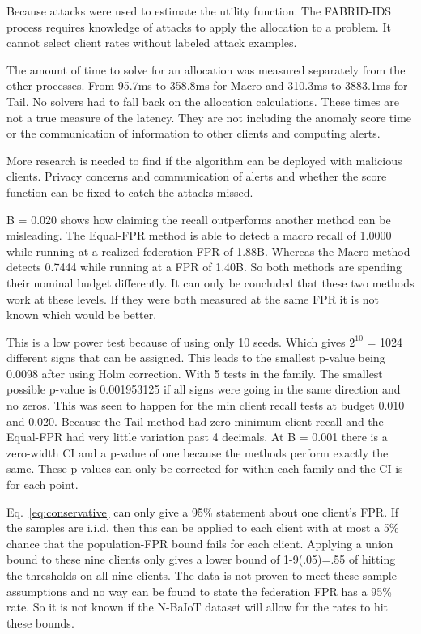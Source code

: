\documentclass[pdflatex,sn-mathphys-num]{sn-jnl}
\begin{document}
Because attacks were used to estimate the utility function. The FABRID-IDS process requires knowledge of attacks to apply the allocation to a problem. It cannot select client rates without labeled attack examples.

The amount of time to solve for an allocation was measured separately from the other processes. From 95.7ms to 358.8ms for Macro and 310.3ms to 3883.1ms for Tail. No solvers had to fall back on the allocation calculations. These times are not a true measure of the latency. They are not including the anomaly score time or the communication of information to other clients and computing alerts.

More research is needed to find if the algorithm can be deployed with malicious clients. Privacy concerns and communication of alerts and whether the score function can be fixed to catch the attacks missed.

B = 0.020 shows how claiming the recall outperforms another method can be misleading. The Equal-FPR method is able to detect a macro recall of 1.0000 while running at a realized federation FPR of 1.88B. Whereas the Macro method detects 0.7444 while running at a FPR of 1.40B. So both methods are spending their nominal budget differently. It can only be concluded that these two methods work at these levels. If they were both measured at the same FPR it is not known which would be better.

This is a low power test because of using only 10 seeds. Which gives $2^{10}$ = 1024 different signs that can be assigned. This leads to the smallest p-value being 0.0098 after using Holm correction. With 5 tests in the family. The smallest possible p-value is 0.001953125 if all signs were going in the same direction and no zeros. This was seen to happen for the min client recall tests at budget 0.010 and 0.020. Because the Tail method had zero minimum-client recall and the Equal-FPR had very little variation past 4 decimals. At B = 0.001 there is a zero-width CI and a p-value of one because the methods perform exactly the same. These p-values can only be corrected for within each family and the CI is for each point.

Eq.~\ref{eq:conservative} can only give a 95\% statement about one client's FPR. If the samples are i.i.d. then this can be applied to each client with at most a 5\% chance that the population-FPR bound fails for each client. Applying a union bound to these nine clients only gives a lower bound of 1-9(.05)=.55 of hitting the thresholds on all nine clients. The data is not proven to meet these sample assumptions and no way can be found to state the federation FPR has a 95\% rate. So it is not known if the N-BaIoT dataset will allow for the rates to hit these bounds.
\end{document}
